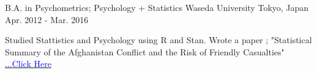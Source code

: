 

\begin{cventries}

  \cventry
    {B.A. in Psychometrics; Psychology + Statistics} %
    {Waseda University} %
    {Tokyo, Japan} %
    {Apr. 2012 - Mar. 2016} %
    {
      \begin{cvitems} %
        \item {Studied Stattistics and Psychology using R and Stan. Wrote a paper ; "Statistical Summary of the Afghanistan Conflict and the Risk of Friendly Casualties" \href{https://github.com/s-87date/afghan_war_diary}{\textcolor{blue}{...Click Here}}}
      \end{cvitems}
    }

\end{cventries}
